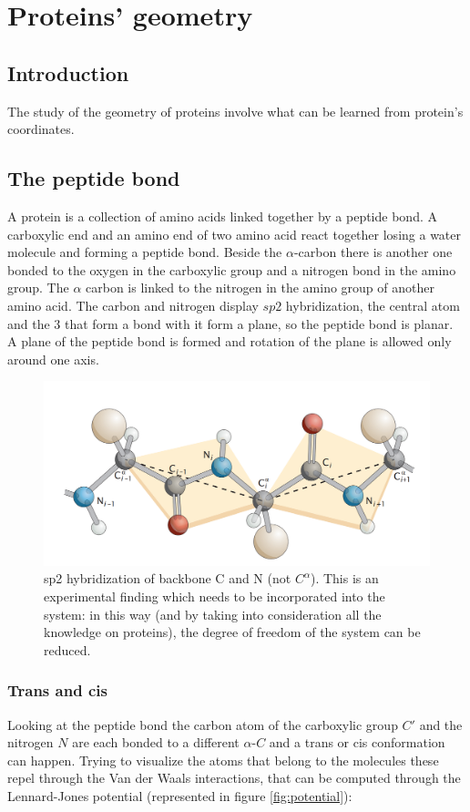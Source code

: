 \graphicspath{{chapters/02/images/}}
\chapter{Proteins' geometry}

\section{Introduction}
The study of the geometry of proteins involve what can be learned from protein's coordinates.

\section{The peptide bond}
A protein is a collection of amino acids linked together by a peptide bond.
A carboxylic end and an amino end of two amino acid react together losing a water molecule and forming a peptide bond.
Beside the $\alpha$-carbon there is another one bonded to the oxygen in the carboxylic group and a nitrogen bond in the amino group.
The $\alpha$ carbon is linked to the nitrogen in the amino group of another amino acid.
The carbon and nitrogen display $sp2$ hybridization, the central atom and the $3$ that form a bond with it form a plane, so the peptide bond is planar.
A plane of the peptide bond is formed and rotation of the plane is allowed only around one axis.
\begin{figure}[H]
	\centering
	\includegraphics[width=\textwidth]{planar.png}
	\caption{sp2 hybridization of backbone C and N (not $C^{\alpha}$). This is an experimental finding which needs to be incorporated into the system: in this way (and by taking into consideration all the knowledge on proteins), the degree of freedom of the system can be reduced.}
	\label{fig:planar}
\end{figure}

	\subsection{Trans and cis}
	Looking at the peptide bond the carbon atom of the carboxylic group $C'$ and the nitrogen $N$ are each bonded to a different $\alpha$-$C$ and a trans or cis conformation can happen.
	Trying to visualize the atoms that belong to the molecules these repel through the Van der Waals interactions, that can be computed through the Lennard-Jones potential (represented in figure \ref{fig:potential}):


